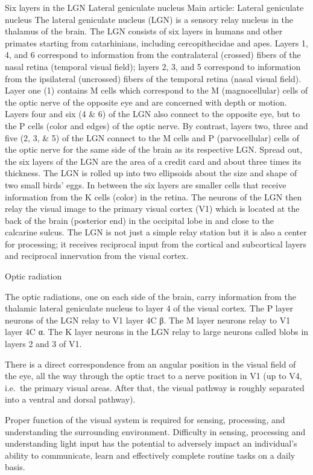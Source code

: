 \documentclass[]{book}
\begin{document}
Six layers in the LGN
Lateral geniculate nucleus
Main article: Lateral geniculate nucleus
The lateral geniculate nucleus (LGN) is a sensory relay nucleus in the thalamus of the brain. The LGN consists of six layers in humans and other primates starting from catarhinians, including cercopithecidae and apes. Layers 1, 4, and 6 correspond to information from the contralateral (crossed) fibers of the nasal retina (temporal visual field); layers 2, 3, and 5 correspond to information from the ipsilateral (uncrossed) fibers of the temporal retina (nasal visual field). Layer one (1) contains M cells which correspond to the M (magnocellular) cells of the optic nerve of the opposite eye and are concerned with depth or motion. Layers four and six (4 \& 6) of the LGN also connect to the opposite eye, but to the P cells (color and edges) of the optic nerve. By contrast, layers two, three and five (2, 3, \& 5) of the LGN connect to the M cells and P (parvocellular) cells of the optic nerve for the same side of the brain as its respective LGN. Spread out, the six layers of the LGN are the area of a credit card and about three times its thickness. The LGN is rolled up into two ellipsoids about the size and shape of two small birds' eggs. In between the six layers are smaller cells that receive information from the K cells (color) in the retina. The neurons of the LGN then relay the visual image to the primary visual cortex (V1) which is located at the back of the brain (posterior end) in the occipital lobe in and close to the calcarine sulcus. The LGN is not just a simple relay station but it is also a center for processing; it receives reciprocal input from the cortical and subcortical layers and reciprocal innervation from the visual cortex.

Optic radiation

The optic radiations, one on each side of the brain, carry information from the thalamic lateral geniculate nucleus to layer 4 of the visual cortex. The P layer neurons of the LGN relay to V1 layer 4C β. The M layer neurons relay to V1 layer 4C α. The K layer neurons in the LGN relay to large neurons called blobs in layers 2 and 3 of V1.

There is a direct correspondence from an angular position in the visual field of the eye, all the way through the optic tract to a nerve position in V1 (up to V4, i.e.~the primary visual areas. After that, the visual pathway is roughly separated into a ventral and dorsal pathway).

Proper function of the visual system is required for sensing, processing, and understanding the surrounding environment. Difficulty in sensing, processing and understanding light input has the potential to adversely impact an individual's ability to communicate, learn and effectively complete routine tasks on a daily basis.
\end{document}
